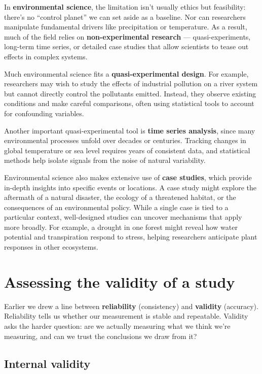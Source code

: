 \documentclass[
  letterpaper,
  DIV=11,
  numbers=noendperiod]{scrreprt}
\begin{document}
In \textbf{environmental science}, the limitation isn't usually ethics
but feasibility: there's no ``control planet'' we can set aside as a
baseline. Nor can researchers manipulate fundamental drivers like
precipitation or temperature. As a result, much of the field relies on
\textbf{non-experimental research} --- quasi-experiments, long-term time
series, or detailed case studies that allow scientists to tease out
effects in complex systems.

Much environmental science fits a \textbf{quasi-experimental design}.
For example, researchers may wish to study the effects of industrial
pollution on a river system but cannot directly control the pollutants
emitted. Instead, they observe existing conditions and make careful
comparisons, often using statistical tools to account for confounding
variables.

Another important quasi-experimental tool is \textbf{time series
analysis}, since many environmental processes unfold over decades or
centuries. Tracking changes in global temperature or sea level requires
years of consistent data, and statistical methods help isolate signals
from the noise of natural variability.

Environmental science also makes extensive use of \textbf{case studies},
which provide in-depth insights into specific events or locations. A
case study might explore the aftermath of a natural disaster, the
ecology of a threatened habitat, or the consequences of an environmental
policy. While a single case is tied to a particular context,
well-designed studies can uncover mechanisms that apply more broadly.
For example, a drought in one forest might reveal how water potential
and transpiration respond to stress, helping researchers anticipate
plant responses in other ecosystems.

\section{Assessing the validity of a
study}\label{assessing-the-validity-of-a-study}

Earlier we drew a line between \textbf{reliability} (consistency) and
\textbf{validity} (accuracy). Reliability tells us whether our
measurement is stable and repeatable. Validity asks the harder question:
are we actually measuring what we think we're measuring, and can we
trust the conclusions we draw from it?

\subsection{Internal validity}\label{internal-validity}
\end{document}
